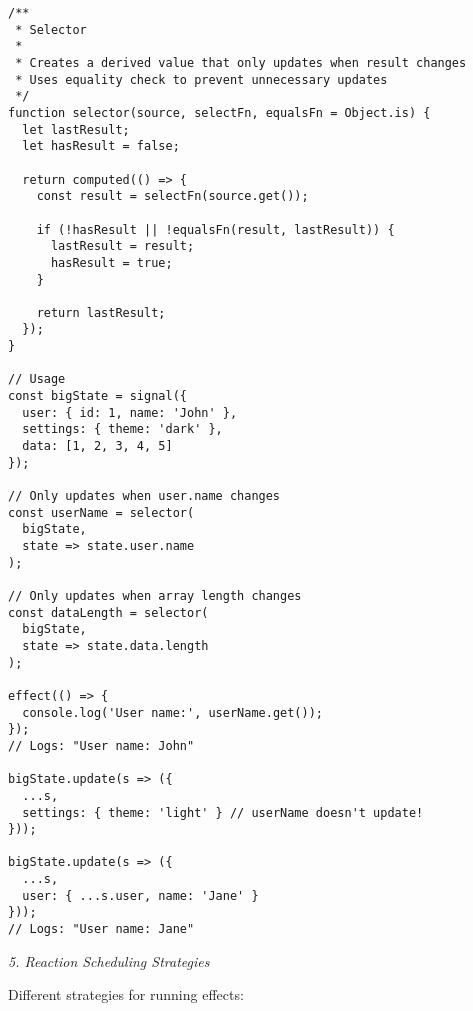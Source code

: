 \documentclass[11pt]{article}
\begin{document}
\begin{verbatim}
/**
 * Selector
 * 
 * Creates a derived value that only updates when result changes
 * Uses equality check to prevent unnecessary updates
 */
function selector(source, selectFn, equalsFn = Object.is) {
  let lastResult;
  let hasResult = false;
  
  return computed(() => {
    const result = selectFn(source.get());
    
    if (!hasResult || !equalsFn(result, lastResult)) {
      lastResult = result;
      hasResult = true;
    }
    
    return lastResult;
  });
}

// Usage
const bigState = signal({
  user: { id: 1, name: 'John' },
  settings: { theme: 'dark' },
  data: [1, 2, 3, 4, 5]
});

// Only updates when user.name changes
const userName = selector(
  bigState,
  state => state.user.name
);

// Only updates when array length changes
const dataLength = selector(
  bigState,
  state => state.data.length
);

effect(() => {
  console.log('User name:', userName.get());
});
// Logs: "User name: John"

bigState.update(s => ({
  ...s,
  settings: { theme: 'light' } // userName doesn't update!
}));

bigState.update(s => ({
  ...s,
  user: { ...s.user, name: 'Jane' }
}));
// Logs: "User name: Jane"
\end{verbatim}

\emph{5. Reaction Scheduling Strategies}

Different strategies for running effects:
\end{document}
